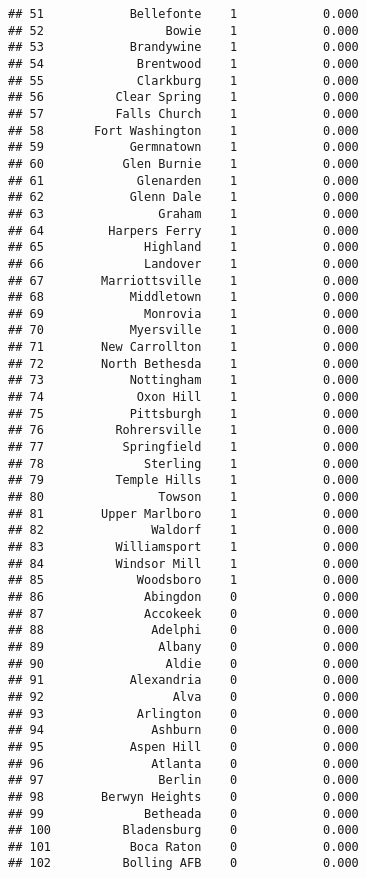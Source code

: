 \documentclass[]{article}
\begin{document}
\begin{verbatim}
## 51            Bellefonte    1            0.000
## 52                 Bowie    1            0.000
## 53            Brandywine    1            0.000
## 54             Brentwood    1            0.000
## 55             Clarkburg    1            0.000
## 56          Clear Spring    1            0.000
## 57          Falls Church    1            0.000
## 58       Fort Washington    1            0.000
## 59            Germnatown    1            0.000
## 60           Glen Burnie    1            0.000
## 61             Glenarden    1            0.000
## 62            Glenn Dale    1            0.000
## 63                Graham    1            0.000
## 64         Harpers Ferry    1            0.000
## 65              Highland    1            0.000
## 66              Landover    1            0.000
## 67        Marriottsville    1            0.000
## 68            Middletown    1            0.000
## 69              Monrovia    1            0.000
## 70            Myersville    1            0.000
## 71        New Carrollton    1            0.000
## 72        North Bethesda    1            0.000
## 73            Nottingham    1            0.000
## 74             Oxon Hill    1            0.000
## 75            Pittsburgh    1            0.000
## 76          Rohrersville    1            0.000
## 77           Springfield    1            0.000
## 78              Sterling    1            0.000
## 79          Temple Hills    1            0.000
## 80                Towson    1            0.000
## 81        Upper Marlboro    1            0.000
## 82               Waldorf    1            0.000
## 83          Williamsport    1            0.000
## 84          Windsor Mill    1            0.000
## 85             Woodsboro    1            0.000
## 86              Abingdon    0            0.000
## 87              Accokeek    0            0.000
## 88               Adelphi    0            0.000
## 89                Albany    0            0.000
## 90                 Aldie    0            0.000
## 91            Alexandria    0            0.000
## 92                  Alva    0            0.000
## 93             Arlington    0            0.000
## 94               Ashburn    0            0.000
## 95            Aspen Hill    0            0.000
## 96               Atlanta    0            0.000
## 97                Berlin    0            0.000
## 98        Berwyn Heights    0            0.000
## 99              Betheada    0            0.000
## 100          Bladensburg    0            0.000
## 101           Boca Raton    0            0.000
## 102          Bolling AFB    0            0.000

\end{verbatim}
\end{document}
